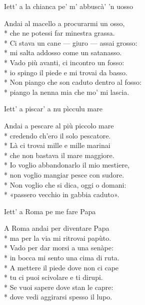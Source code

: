 \documentclass[11pt]{book}
\begin{document}
\begin{poem}{Iett’ a la chianca pe’ m’ abbuscà’ ’n uosso}{}
\settowidth{\versewidth}{Non piango che son caduto dentro al fosso}
\begin{altverse}
Andai al macello a procurarmi un osso,\\*
che ne potessi far minestra grassa.\\*
Ci stava un cane — giuro — assai grosso:\\*
mi salta addosso come un satanasso.\\*
Vado più avanti, ci incontro un fosso:\\*
io spingo il piede e mi trovai da basso.\\*
Non piango che son caduto dentro al fosso:\\*
piango la nenna mia che mo’ mi lascia.
\end{altverse}
\end{poem}

\begin{poem}{Iett’ a piscar’ a nu pìcculu mare}{}
\settowidth{\versewidth}{Io voglio abbandonarlo il mio mestiere}
\begin{altverse}
Andai a pescare al più piccolo mare\\*
credendo ch’ero il solo pescatore.\\*
Là ci trovai mille e mille marinai\\*
che non bastava il mare maggiore.\\*
Io voglio abbandonarlo il mio mestiere,\\*
non voglio mangiar pesce con sudore.\\*
Non voglio che si dica, oggi o domani:\\*
«passero vecchio in gabbia caduto».
\end{altverse}
\end{poem}

\begin{poem}{Iett’ a Roma pe me fare Papa}{}
\settowidth{\versewidth}{A mettere il piede dove non ci cape}
\begin{altverse}
A Roma andai per diventare Papa\\*
ma per la via mi ritrovai papùto.\\*
Vado per dar morsi a una senàpe:\\*
in bocca mi sento una cima di ruta.\\*
A mettere il piede dove non ci cape\\*
tu ci puoi scivolare e ti dirupi.\\*
Se vuoi sapere dove stan le capre:\\*
dove vedi aggirarsi spesso il lupo.
\end{altverse}
\end{poem}
\end{document}
